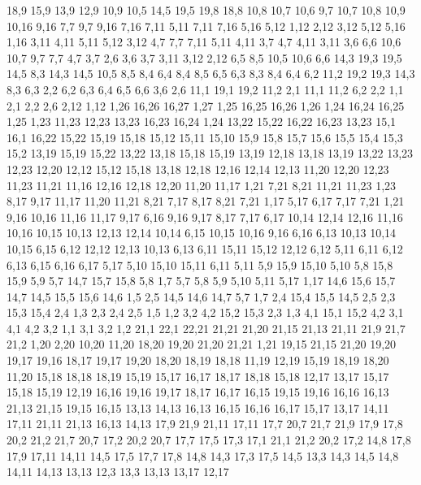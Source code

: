 18,9
15,9
13,9
12,9
10,9
%
10,5
14,5
19,5
19,8
18,8
10,8
10,7
10,6
%
9,7
10,7
10,8
10,9
10,16
9,16
%
7,7
9,7
9,16
7,16
7,11
%
5,11
7,11
7,16
5,16
5,12
%
1,12
2,12
3,12
5,12
5,16
1,16
%
3,11
4,11
5,11
5,12
3,12
%
4,7
7,7
7,11
5,11
4,11
%
3,7
4,7
4,11
3,11
%
3,6
6,6
10,6
10,7
9,7
7,7
4,7
3,7
%
2,6
3,6
3,7
3,11
3,12
2,12
%
6,5
8,5
10,5
10,6
6,6
%
14,3
19,3
19,5
14,5
%
8,3
14,3
14,5
10,5
8,5
8,4
%
6,4
8,4
8,5
6,5
%
6,3
8,3
8,4
6,4
%
6,2
11,2
19,2
19,3
14,3
8,3
6,3
%
2,2
6,2
6,3
6,4
6,5
6,6
3,6
2,6
%
11,1
19,1
19,2
11,2
%
2,1
11,1
11,2
6,2
2,2
%
1,1
2,1
2,2
2,6
2,12
1,12
1,26
16,26
16,27
1,27
%
1,25
16,25
16,26
1,26
%
1,24
16,24
16,25
1,25
%
1,23
11,23
12,23
13,23
16,23
16,24
1,24
%
13,22
15,22
16,22
16,23
13,23
%
15,1
16,1
16,22
15,22
15,19
15,18
15,12
15,11
15,10
15,9
15,8
15,7
15,6
15,5
15,4
15,3
15,2
%
13,19
15,19
15,22
13,22
%
13,18
15,18
15,19
13,19
%
12,18
13,18
13,19
13,22
13,23
12,23
12,20
%
12,12
15,12
15,18
13,18
12,18
12,16
12,14
12,13
%
11,20
12,20
12,23
11,23
11,21
%
11,16
12,16
12,18
12,20
11,20
11,17
%
1,21
7,21
8,21
11,21
11,23
1,23
%
8,17
9,17
11,17
11,20
11,21
8,21
%
7,17
8,17
8,21
7,21
%
1,17
5,17
6,17
7,17
7,21
1,21
%
9,16
10,16
11,16
11,17
9,17
%
6,16
9,16
9,17
8,17
7,17
6,17
%
10,14
12,14
12,16
11,16
10,16
10,15
%
10,13
12,13
12,14
10,14
%
6,15
10,15
10,16
9,16
6,16
%
6,13
10,13
10,14
10,15
6,15
%
6,12
12,12
12,13
10,13
6,13
%
6,11
15,11
15,12
12,12
6,12
%
5,11
6,11
6,12
6,13
6,15
6,16
6,17
5,17
%
5,10
15,10
15,11
6,11
5,11
%
5,9
15,9
15,10
5,10
%
5,8
15,8
15,9
5,9
%
5,7
14,7
15,7
15,8
5,8
%
1,7
5,7
5,8
5,9
5,10
5,11
5,17
1,17
%
14,6
15,6
15,7
14,7
%
14,5
15,5
15,6
14,6
%
1,5
2,5
14,5
14,6
14,7
5,7
1,7
%
2,4
15,4
15,5
14,5
2,5
%
2,3
15,3
15,4
2,4
%
1,3
2,3
2,4
2,5
1,5
%
1,2
3,2
4,2
15,2
15,3
2,3
1,3
%
4,1
15,1
15,2
4,2
%
3,1
4,1
4,2
3,2
%
1,1
3,1
3,2
1,2
21,1
22,1
22,21
21,21
21,20
21,15
21,13
21,11
21,9
21,7
21,2
%
1,20
2,20
10,20
11,20
18,20
19,20
21,20
21,21
1,21
%
19,15
21,15
21,20
19,20
19,17
19,16
%
18,17
19,17
19,20
18,20
18,19
18,18
%
11,19
12,19
15,19
18,19
18,20
11,20
%
15,18
18,18
18,19
15,19
%
15,17
16,17
18,17
18,18
15,18
%
12,17
13,17
15,17
15,18
15,19
12,19
%
16,16
19,16
19,17
18,17
16,17
%
16,15
19,15
19,16
16,16
%
16,13
21,13
21,15
19,15
16,15
%
13,13
14,13
16,13
16,15
16,16
16,17
15,17
13,17
%
14,11
17,11
21,11
21,13
16,13
14,13
%
17,9
21,9
21,11
17,11
%
17,7
20,7
21,7
21,9
17,9
17,8
%
20,2
21,2
21,7
20,7
%
17,2
20,2
20,7
17,7
17,5
17,3
%
17,1
21,1
21,2
20,2
17,2
%
14,8
17,8
17,9
17,11
14,11
%
14,5
17,5
17,7
17,8
14,8
%
14,3
17,3
17,5
14,5
%
13,3
14,3
14,5
14,8
14,11
14,13
13,13
%
12,3
13,3
13,13
13,17
12,17
